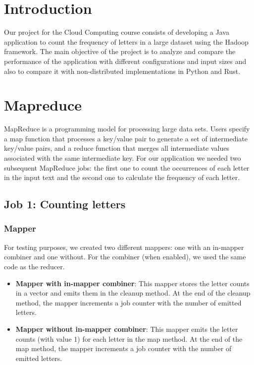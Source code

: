 \documentclass{article}
\begin{document}
\begin{multicols}{2}
\section{Introduction}
    Our project for the Cloud Computing course consists of developing a Java application to count
    the frequency of letters in a large dataset using the Hadoop framework.
    The main objective of the project is to analyze and compare the performance of the application
    with different configurations and input sizes and also to compare it with non-distributed
    implementations in Python and Rust.
\section{Mapreduce}
    MapReduce is a programming model for processing large data sets. 
    Users specify a map function that processes a key/value pair to generate a set
    of intermediate key/value pairs, and a reduce function that merges all intermediate values
    associated with the same intermediate key.
    For our application we needed two subsequent MapReduce jobs: the first one to count the occurrences
    of each letter in the input text and the second one to calculate the frequency of each letter.
    \subsection{Job 1: Counting letters}
        \subsubsection{Mapper}
            For testing purposes, we created two different mappers: one with an in-mapper combiner and one 
            without.
            For the combiner (when enabled), we used the same code as the reducer.
            \begin{itemize}
                \item \textbf{Mapper with in-mapper combiner}:
                This mapper stores the letter counts in a vector and emits them in the cleanup method.
                At the end of the cleanup method, the mapper increments a job counter with the number of emitted 
                letters.
                \item \textbf{Mapper without in-mapper combiner}: 
                This mapper emits the letter counts (with value 1) for each letter in the map method.
                At the end of the map method, the mapper increments a job counter with the number of emitted
                letters.
            \end{itemize}

\end{multicols}
\end{document}
